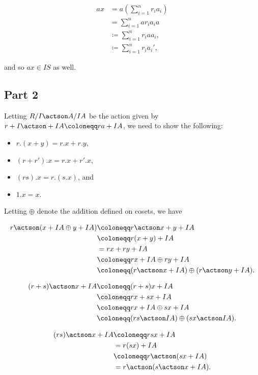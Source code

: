 \begin{align*}
ax &= a \left( \sum_{i=1}^n r_i a_i \right)\\
&= \sum_{i=1}^n a r_i a_i a \\
&\coloneqq \sum_{i=1}^n r_i a a_i, \\
&\coloneqq \sum_{i=1}^n r_i a_i',
\end{align*}

and so \(ax \in IS\) as well.

\hypertarget{part-2}{%
\subsection{Part 2}\label{part-2}}

Letting \(R/I \actson A/IA\) be the action given by
\(r+I \actson + IA \coloneqq ra + IA\), we need to show the following:

\begin{itemize}
\tightlist
\item
  \(r.(x + y) = r.x + r.y\),
\item
  \((r + r').x = r.x + r'.x\),
\item
  \((rs).x = r.(s.x)\), and
\item
  \(1.x = x\).
\end{itemize}

Letting \(\oplus\) denote the addition defined on cosets, we have

\begin{align*}
r \actson (x + IA \oplus y + IA) 
&\coloneqq r \actson x + y + IA \\
&\coloneqq r(x+y) + IA \\
&= rx + ry + IA \\
&\coloneqq rx + IA \oplus ry + IA \\
&\coloneqq (r \actson x + IA) \oplus (r\actson y + IA)
.\end{align*}

\begin{align*}
(r + s) \actson x + IA 
&\coloneqq (r+s)x + IA \\
&\coloneqq rx + sx + IA \\
&\coloneqq rx + IA \oplus sx + IA \\
&\coloneqq (rs \actson IA) \oplus (sx \actson IA)
.\end{align*}

\begin{align*}
(rs) \actson x + IA &\coloneqq rsx + IA \\
&= r(sx) + IA \\
&\coloneqq r \actson(sx + IA) \\
&= r \actson (s \actson x + IA)
.\end{align*}

